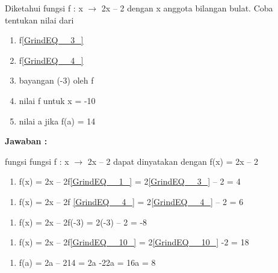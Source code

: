 \documentclass[11pt,fleqn]{book} %
\begin{document}
\noindent Diketahui fungsi f : x $\mathrm{\to}$ 2x -- 2 dengan x anggota bilangan bulat. Coba tentukan nilai dari

\noindent 

\begin{enumerate}
\item  f\eqref{GrindEQ__3_}

\item  f\eqref{GrindEQ__4_}

\item  bayangan (-3) oleh f

\item  nilai f untuk x = -10

\item  nilai a jika f(a) = 14
\end{enumerate}

\noindent 

\noindent \textbf{Jawaban :}

\noindent fungsi fungsi f : x $\mathrm{\to}$ 2x -- 2 dapat dinyatakan dengan f(x) = 2x -- 2

\noindent 

\begin{enumerate}
\item  f(x) = 2x -- 2f\eqref{GrindEQ__1_} = 2\eqref{GrindEQ__3_} -- 2 = 4
\end{enumerate}

\noindent 

\begin{enumerate}
\item  f(x) = 2x -- 2f \eqref{GrindEQ__4_} = 2\eqref{GrindEQ__4_} -- 2 = 6
\end{enumerate}

\noindent 

\begin{enumerate}
\item  f(x) = 2x -- 2f(-3) = 2(-3) -- 2 = -8
\end{enumerate}

\noindent 

\begin{enumerate}
\item  f(x) = 2x -- 2f\eqref{GrindEQ__10_} = 2\eqref{GrindEQ__10_} -2 = 18
\end{enumerate}

\noindent 

\begin{enumerate}
\item  f(a) = 2a -- 214 = 2a -22a = 16a = 8
\end{enumerate}
\end{document}

